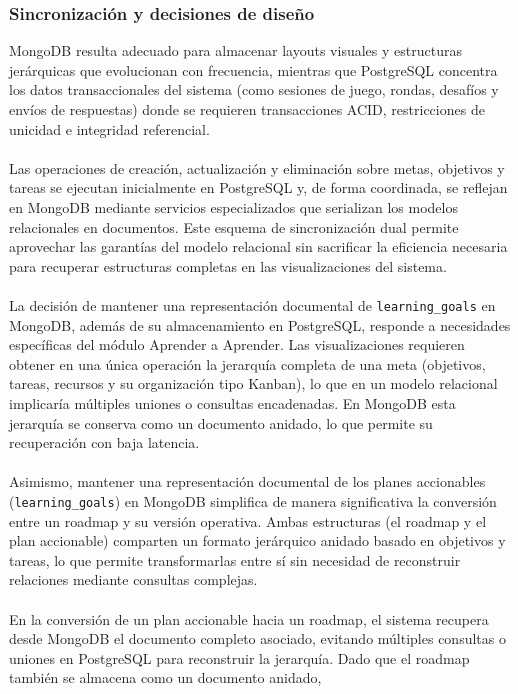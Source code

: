 \subsubsection{Sincronización y decisiones de diseño}
MongoDB resulta adecuado para almacenar layouts visuales y estructuras jerárquicas que evolucionan
con frecuencia, mientras que PostgreSQL concentra los datos transaccionales del sistema (como
sesiones de juego, rondas, desafíos y envíos de respuestas) donde se requieren transacciones ACID,
restricciones de unicidad e integridad referencial.
\\
\\
Las operaciones de creación, actualización y eliminación sobre metas, objetivos y tareas se ejecutan
inicialmente en PostgreSQL y, de forma coordinada, se reflejan en MongoDB mediante servicios
especializados que serializan los modelos relacionales en documentos. Este esquema de
sincronización dual permite aprovechar las garantías del modelo relacional sin sacrificar la
eficiencia necesaria para recuperar estructuras completas en las visualizaciones del sistema.
\\
\\
La decisión de mantener una representación documental de \texttt{learning\_goals} en MongoDB,
además de su almacenamiento en PostgreSQL, responde a necesidades específicas del módulo
Aprender a Aprender. Las visualizaciones requieren obtener en una única operación la jerarquía
completa de una meta (objetivos, tareas, recursos y su organización tipo Kanban), lo que en un
modelo relacional implicaría múltiples uniones o consultas encadenadas. En MongoDB esta jerarquía
se conserva como un documento anidado, lo que permite su recuperación con baja latencia. 
\\
\\
Asimismo, mantener una representación documental de los planes accionables (\texttt{learning\_goals}) en MongoDB simplifica de manera significativa la conversión entre un roadmap y su versión operativa. Ambas
estructuras (el roadmap y el plan accionable) comparten un formato jerárquico anidado basado
en objetivos y tareas, lo que permite transformarlas entre sí sin necesidad de reconstruir relaciones
mediante consultas complejas.
\\
\\
En la conversión de un plan accionable hacia un roadmap, el sistema recupera desde MongoDB el
documento completo asociado, evitando múltiples consultas o uniones en PostgreSQL para
reconstruir la jerarquía. Dado que el roadmap también se almacena como un documento anidado,
